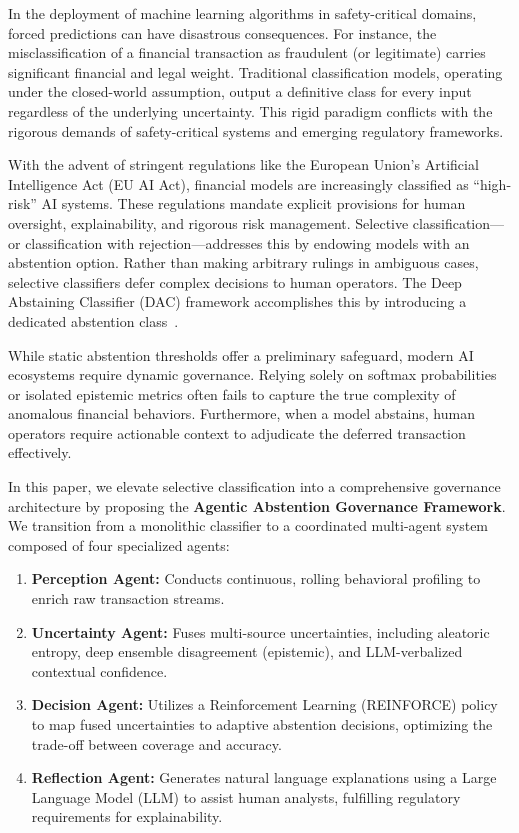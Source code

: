 \documentclass[12pt,a4paper]{article}
\begin{document}
In the deployment of machine learning algorithms in safety-critical domains,
forced predictions can have disastrous consequences. For instance, the
misclassification of a financial transaction as fraudulent (or legitimate)
carries significant financial and legal weight. Traditional classification
models, operating under the closed-world assumption, output a definitive class
for every input regardless of the underlying uncertainty. This rigid paradigm
conflicts with the rigorous demands of safety-critical systems and emerging
regulatory frameworks.

With the advent of stringent regulations like the European Union's Artificial
Intelligence Act (EU AI Act), financial models are increasingly classified as
``high-risk'' AI systems. These regulations mandate explicit provisions for
human oversight, explainability, and rigorous risk management. Selective
classification---or classification with rejection---addresses this by endowing
models with an abstention option. Rather than making arbitrary rulings in
ambiguous cases, selective classifiers defer complex decisions to human
operators. The Deep Abstaining Classifier (DAC) framework accomplishes this by
introducing a dedicated abstention class~\cite{b1}.

While static abstention thresholds offer a preliminary safeguard, modern AI
ecosystems require dynamic governance. Relying solely on softmax probabilities
or isolated epistemic metrics often fails to capture the true complexity of
anomalous financial behaviors. Furthermore, when a model abstains, human
operators require actionable context to adjudicate the deferred transaction
effectively.

In this paper, we elevate selective classification into a comprehensive
governance architecture by proposing the \textbf{Agentic Abstention Governance
Framework}. We transition from a monolithic classifier to a coordinated
multi-agent system composed of four specialized agents:
\begin{enumerate}
  \item \textbf{Perception Agent:} Conducts continuous, rolling behavioral
        profiling to enrich raw transaction streams.
  \item \textbf{Uncertainty Agent:} Fuses multi-source uncertainties, including
        aleatoric entropy, deep ensemble disagreement (epistemic), and
        LLM-verbalized contextual confidence.
  \item \textbf{Decision Agent:} Utilizes a Reinforcement Learning (REINFORCE)
        policy to map fused uncertainties to adaptive abstention decisions,
        optimizing the trade-off between coverage and accuracy.
  \item \textbf{Reflection Agent:} Generates natural language explanations using
        a Large Language Model (LLM) to assist human analysts, fulfilling
        regulatory requirements for explainability.
\end{enumerate}
\end{document}
